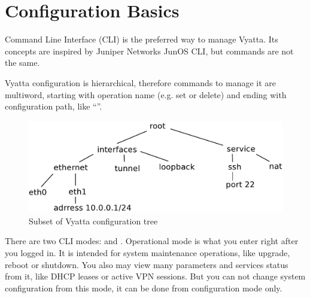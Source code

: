 \chapter{Configuration Basics}
Command Line Interface (CLI) is the preferred way to manage Vyatta. Its concepts are inspired by Juniper Networks
JunOS CLI, but commands are not the same.

Vyatta configuration is hierarchical, therefore commands to manage it are multiword, starting with operation name 
(e.g. set or delete) and ending with configuration path, like ``''.

\begin{figure}[hc]
 \begin{center}
   \includegraphics[width=\textwidth]{images/config_tree}
   \caption{Subset of Vyatta configuration tree}
  \end{center}
\end{figure}


There are two CLI modes:  and . Operational mode is what you enter right after
you logged in. It is intended for system maintenance operations, like upgrade, reboot or shutdown. You also may view
many parameters and services status from it, like DHCP leases or active VPN sessions. But you can not change system
configuration from this mode, it can be done from configuration mode only.

